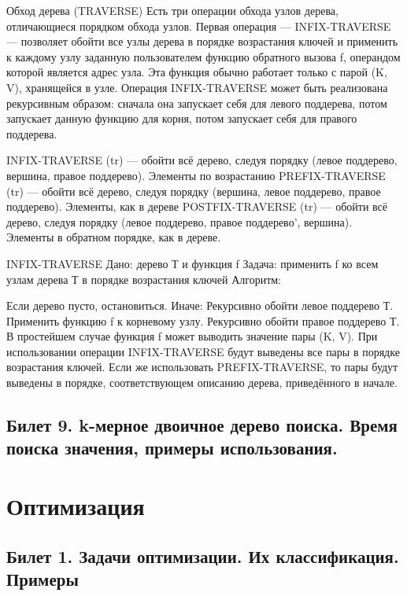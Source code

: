 \documentclass[a4paper, 12pt]{article}
\begin{document}
	Обход дерева (TRAVERSE)
	Есть три операции обхода узлов дерева, отличающиеся порядком обхода узлов.
	Первая операция — INFIX-TRAVERSE — позволяет обойти все узлы дерева в порядке возрастания ключей и применить к каждому узлу заданную пользователем функцию обратного вызова f, операндом которой является адрес узла. Эта функция обычно работает только с парой (K, V), хранящейся в узле. Операция INFIX-TRAVERSE может быть реализована рекурсивным образом: сначала она запускает себя для левого поддерева, потом запускает данную функцию для корня, потом запускает себя для правого поддерева.

	INFIX-TRAVERSE (tr) — обойти всё дерево, следуя порядку (левое поддерево, вершина, правое поддерево). Элементы по возрастанию
	PREFIX-TRAVERSE (tr) — обойти всё дерево, следуя порядку (вершина, левое поддерево, правое поддерево). Элементы, как в дереве
	POSTFIX-TRAVERSE (tr) — обойти всё дерево, следуя порядку (левое поддерево, правое поддерево', вершина). Элементы в обратном порядке, как в дереве.

	INFIX-TRAVERSE
	Дано: дерево Т и функция f
	Задача: применить f ко всем узлам дерева Т в порядке возрастания ключей
	Алгоритм:

	Если дерево пусто, остановиться.
	Иначе:
	Рекурсивно обойти левое поддерево Т.
	Применить функцию f к корневому узлу.
	Рекурсивно обойти правое поддерево Т.
	В простейшем случае функция f может выводить значение пары (K, V). При использовании операции INFIX-TRAVERSE будут выведены все пары в порядке возрастания ключей. Если же использовать PREFIX-TRAVERSE, то пары будут выведены в порядке, соответствующем описанию дерева, приведённого в начале.

	\subsection*{Билет 9.  k-мерное двоичное дерево поиска. Время поиска значения, примеры использования.}




	\section*{Оптимизация}
	\subsection*{Билет 1. Задачи оптимизации. Их классификация. Примеры}
\end{document}
